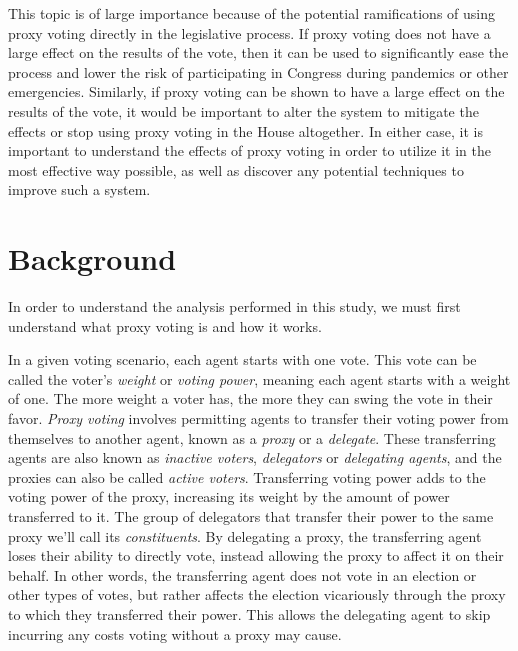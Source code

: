 This topic is of large importance because of the potential ramifications of using
proxy voting directly in the legislative process.
If proxy voting does not have a large effect on the results of the vote, then it
can be used to significantly ease the process and lower the risk of participating in
Congress during pandemics or other emergencies.
Similarly, if proxy voting can be shown to have a large effect on the results of the
vote, it would be important to alter the system to mitigate the effects or stop using
proxy voting in the House altogether.
In either case, it is important to understand the effects of proxy voting in order to
utilize it in the most effective way possible, as well as discover any potential
techniques to improve such a system.


\section{Background}\label{sec:background}
In order to understand the analysis performed in this study, we must first understand
what proxy voting is and how it works.

In a given voting scenario, each agent starts with one vote.
This vote can be called the voter's \textit{weight} or \textit{voting power}, meaning
each agent starts with a weight of one.
The more weight a voter has, the more they can swing the vote in their favor.
\textit{Proxy voting} involves permitting agents to transfer their voting power
from themselves to another agent, known as a \textit{proxy} or a \textit{delegate}.
These transferring agents are also known as \textit{inactive voters},
\textit{delegators} or \textit{delegating agents}, and the proxies can also be called
\textit{active voters}.
Transferring voting power adds to the voting power of the proxy, increasing its
weight by the amount of power transferred to it.
The group of delegators that transfer their power to the same proxy we'll call its
\textit{constituents}.
By delegating a proxy, the transferring agent loses their ability to directly vote,
instead allowing the proxy to affect it on their behalf.
In other words, the transferring agent does not vote in an election or other types of
votes, but rather affects the election vicariously through the proxy to which they
transferred their power.
This allows the delegating agent to skip incurring any costs voting without a proxy
may cause.

